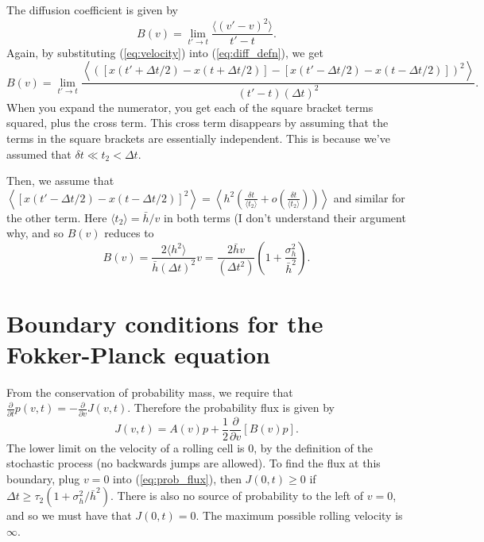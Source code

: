 \documentclass[
10pt, %
letterpaper, %
twocolumn, %
landscape %
]{article}
\begin{document}
The diffusion coefficient is given by 
\begin{equation}
  \label{eq:diff_defn}
  B(v) = \lim_{t' \rightarrow t}\frac{\langle (v' - v)^2 \rangle}{t' - t}.
\end{equation}
Again, by substituting (\ref{eq:velocity}) into (\ref{eq:diff_defn}),
we get 
\begin{equation*}
  B(v) = \lim_{t' \rightarrow t}\frac{\left\langle ([x(t' + \Delta t/2) -
    x(t + \Delta t/2)] - [x(t' - \Delta t/2) - x(t - \Delta
    t/2)])^2\right\rangle}{(t' - t)(\Delta t)^2}. 
\end{equation*}
When you expand the numerator, you get each of the square bracket
terms squared, plus the cross term. This cross term disappears by
assuming that the terms in the square brackets are essentially
independent. This is because we've assumed that $\delta t \ll t_2 <
\Delta t$.

Then, we assume that $\left\langle [x(t'-\Delta t/2) - x(t - \Delta
  t/2)]^2\right\rangle = \left\langle h^2\left(\frac{\delta t}{\langle
      t_2 \rangle} + o\left(\frac{\delta t}{\langle t_2
        \rangle}\right)\right) \right\rangle$ and similar for the
other term. Here $\langle t_2 \rangle = \bar{h}/v$ in both terms (I
don't understand their argument why, and so $B(v)$ reduces to 
\begin{equation*}
  B(v) = \frac{2 \langle h^2 \rangle}{\bar{h}(\Delta t)^2}v = \frac{2
    \bar{h} v}{(\Delta t^2)}\left(1 + \frac{\sigma_h^2}{\bar{h}^2}\right).
\end{equation*}


\section{Boundary conditions for the Fokker-Planck equation}

From the conservation of probability mass, we require that
$\frac{\partial}{\partial t}p(v, t) = -\frac{\partial}{\partial v} J(v,
t)$. Therefore the probability flux is given by
\begin{equation}
  \label{eq:prob_flux}
  J(v, t) = A(v)p + \frac{1}{2}\frac{\partial}{\partial v}[B(v)p].
\end{equation}
The lower limit on the velocity of a rolling cell is 0, by the
definition of the stochastic process (no backwards jumps are
allowed). To find the flux at this boundary, plug $v = 0$ into
(\ref{eq:prob_flux}), then $J(0, t) \ge 0$ if $\Delta t \ge
\tau_2(1 + \sigma^2_h/\bar{h}^2).$ There is also no source of
probability to the left of $v = 0$, and so we must have that $J(0, t)
= 0$. The maximum possible rolling velocity is $\infty$.
\end{document}
